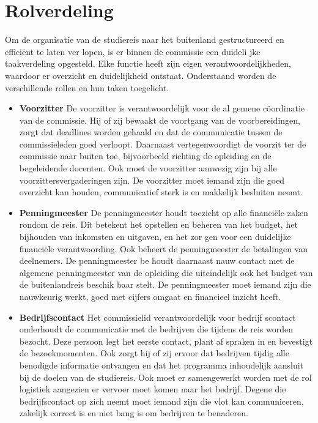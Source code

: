 \section{Rolverdeling}
Om de organisatie van de studiereis naar het
buitenland gestructureerd en efficiënt te laten ver
lopen, is er binnen de commissie een duideli
jke taakverdeling opgesteld. Elke functie heeft zijn
eigen verantwoordelijkheden, waardoor er overzicht
en duidelijkheid ontstaat. Onderstaand worden de
verschillende rollen en hun taken toegelicht.

\begin{itemize}
	\item \textbf{Voorzitter} De voorzitter is verantwoordelijk voor de al
	gemene cöordinatie van de commissie. Hij of zij
	bewaakt de voortgang van de voorbereidingen,
	zorgt dat deadlines worden gehaald en dat de
	communicatie tussen de commissieleden goed
	verloopt. Daarnaast vertegenwoordigt de voorzit
	ter de commissie naar buiten toe, bijvoorbeeld
	richting de opleiding en de begeleidende docenten.
	Ook moet de voorzitter aanwezig zijn bij
	alle voorzittersvergaderingen zijn. De voorzitter
	moet iemand zijn die goed overzicht kan houden,
	communicatief sterk is en makkelijk besluiten
	neemt.
	
	\vspace{0.5cm}
	
	\item \textbf{Penningmeester} De penningmeester houdt toezicht op alle financiële zaken rondom de reis. Dit betekent
	het opstellen en beheren van het budget, het
	bijhouden van inkomsten en uitgaven, en het zor
	gen voor een duidelijke financiële verantwoording.
	Ook beheert de penningmeester de betalingen van deelnemers.
	De penningmeester be
	houdt daarnaast nauw contact met de algemene penningmeester van de opleiding die uiteindelijk
	ook het budget van de buitenlandreis beschik
	baar stelt. De penningmeester moet iemand zijn
	die nauwkeurig werkt, goed met cijfers omgaat
	en financieel inzicht heeft.
	
	\item \textbf{Bedrijfscontact} Het commissielid verantwoordelijk voor bedrijf
	scontact onderhoudt de communicatie met de
	bedrijven die tijdens de reis worden bezocht.
	Deze persoon legt het eerste contact, plant af
	spraken in en bevestigt de bezoekmomenten.
	Ook zorgt hij of zij ervoor dat bedrijven tijdig alle
	benodigde informatie ontvangen en dat het programma inhoudelijk aansluit bij de doelen van de
	studiereis. Ook moet er samengewerkt worden
	met de rol logistiek aangezien er vervoer moet
	komen naar het bedrijf. Degene die bedrijfscontact op zich neemt moet iemand zijn die vlot kan
	communiceren, zakelijk correct is en niet bang is
	om bedrijven te benaderen.
	

\end{itemize}
